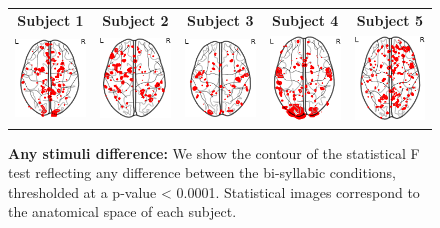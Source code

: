 \begin{figure}[ht]
\scriptsize
\vspace{5ex}
\hspace{-4ex}
\begin{tabular}{ccccc}
\textbf{\Large Subject 1} & \textbf{\Large Subject 2} & \textbf{\Large Subject 3} & \textbf{\Large Subject 4} & \textbf{\Large Subject 5}\\
{\includegraphics[width=.165\linewidth]{figures/part_II/any-effects_01.pdf}}
\hspace{1ex}
&{\includegraphics[width=.165\linewidth]{figures/part_II/any-effects_03.pdf}}
\hspace{1ex}
&{\includegraphics[width=.165\linewidth]{figures/part_II/any-effects_04.pdf}}
\hspace{1ex}
&{\includegraphics[width=.165\linewidth]{figures/part_II/any-effects_05.pdf}}
\hspace{1ex}
&{\includegraphics[width=.165\linewidth]{figures/part_II/any-effects_06.pdf}}
\hspace{1ex}\\
\end{tabular}
\vspace{3ex}
\caption{\textbf{Any stimuli difference:} We show the contour of the statistical F test reflecting any difference between the bi-syllabic conditions, thresholded at a p-value < 0.0001. Statistical images correspond to the anatomical space of each subject.}
\label{fig:any-effects}
\end{figure}


